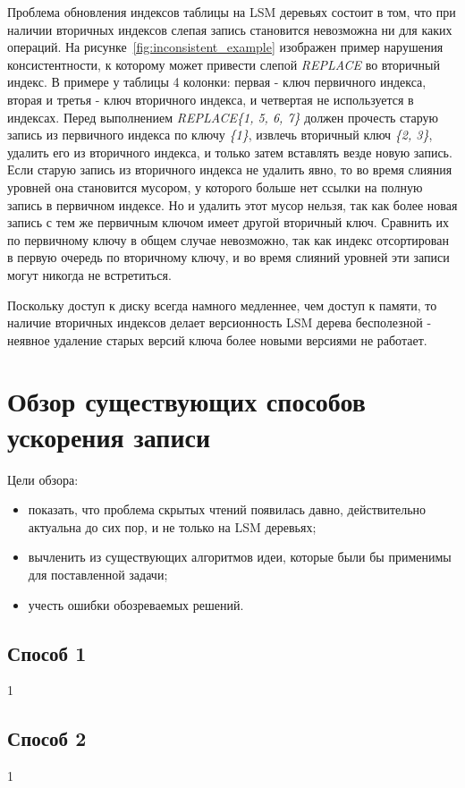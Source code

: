 \documentclass[a4paper,hidelinks,12pt]{article}
\begin{document}
Проблема обновления индексов таблицы на LSM деревьях состоит в том, что при
наличии вторичных индексов слепая запись становится невозможна ни для каких
операций. На рисунке~\ref{fig:inconsistent_example} изображен пример нарушения
консистентности, к которому может привести слепой \textit{REPLACE} во вторичный
индекс. В примере у таблицы 4 колонки: первая - ключ первичного индекса,
вторая и третья - ключ вторичного индекса, и четвертая не используется в
индексах. Перед выполнением \textit{REPLACE\{1, 5, 6, 7\}} должен прочесть
старую запись из первичного индекса по ключу \textit{\{1\}}, извлечь вторичный
ключ \textit{\{2, 3\}}, удалить его из вторичного индекса, и только затем
вставлять везде новую запись. Если старую запись из вторичного индекса не
удалить явно, то во время слияния уровней она становится мусором, у которого
больше нет ссылки на полную запись в первичном индексе. Но и удалить этот мусор
нельзя, так как более новая запись с тем же первичным ключом имеет другой
вторичный ключ. Сравнить их по первичному ключу в общем случае невозможно, так
как индекс отсортирован в первую очередь по вторичному ключу, и во время слияний
уровней эти записи могут никогда не встретиться.

Поскольку доступ к диску всегда намного медленнее, чем доступ к памяти, то
наличие вторичных индексов делает версионность LSM дерева бесполезной - неявное
удаление старых версий ключа более новыми версиями не работает.

\section{Обзор существующих способов ускорения записи}
Цели обзора:
\begin{itemize}
\item показать, что проблема скрытых чтений появилась давно, действительно
актуальна до сих пор, и не только на LSM деревьях;
\item вычленить из существующих алгоритмов идеи, которые были бы применимы для
поставленной задачи;
\item учесть ошибки обозреваемых решений.
\end{itemize}

\subsection{Способ 1}
1

\subsection{Способ 2}
1
\end{document}
